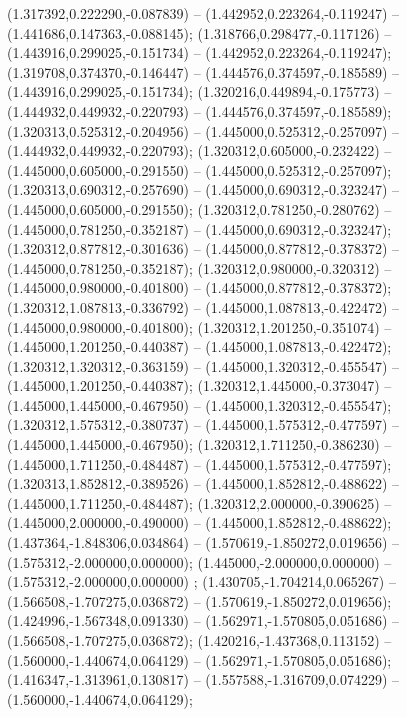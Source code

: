 (1.317392,0.222290,-0.087839) -- (1.442952,0.223264,-0.119247) -- (1.441686,0.147363,-0.088145);
 (1.318766,0.298477,-0.117126) -- (1.443916,0.299025,-0.151734) -- (1.442952,0.223264,-0.119247);
 (1.319708,0.374370,-0.146447) -- (1.444576,0.374597,-0.185589) -- (1.443916,0.299025,-0.151734);
 (1.320216,0.449894,-0.175773) -- (1.444932,0.449932,-0.220793) -- (1.444576,0.374597,-0.185589);
 (1.320313,0.525312,-0.204956) -- (1.445000,0.525312,-0.257097) -- (1.444932,0.449932,-0.220793);
 (1.320312,0.605000,-0.232422) -- (1.445000,0.605000,-0.291550) -- (1.445000,0.525312,-0.257097);
 (1.320313,0.690312,-0.257690) -- (1.445000,0.690312,-0.323247) -- (1.445000,0.605000,-0.291550);
 (1.320312,0.781250,-0.280762) -- (1.445000,0.781250,-0.352187) -- (1.445000,0.690312,-0.323247);
 (1.320312,0.877812,-0.301636) -- (1.445000,0.877812,-0.378372) -- (1.445000,0.781250,-0.352187);
 (1.320312,0.980000,-0.320312) -- (1.445000,0.980000,-0.401800) -- (1.445000,0.877812,-0.378372);
 (1.320312,1.087813,-0.336792) -- (1.445000,1.087813,-0.422472) -- (1.445000,0.980000,-0.401800);
 (1.320312,1.201250,-0.351074) -- (1.445000,1.201250,-0.440387) -- (1.445000,1.087813,-0.422472);
 (1.320312,1.320312,-0.363159) -- (1.445000,1.320312,-0.455547) -- (1.445000,1.201250,-0.440387);
 (1.320312,1.445000,-0.373047) -- (1.445000,1.445000,-0.467950) -- (1.445000,1.320312,-0.455547);
 (1.320312,1.575312,-0.380737) -- (1.445000,1.575312,-0.477597) -- (1.445000,1.445000,-0.467950);
 (1.320312,1.711250,-0.386230) -- (1.445000,1.711250,-0.484487) -- (1.445000,1.575312,-0.477597);
 (1.320313,1.852812,-0.389526) -- (1.445000,1.852812,-0.488622) -- (1.445000,1.711250,-0.484487);
 (1.320312,2.000000,-0.390625) -- (1.445000,2.000000,-0.490000) -- (1.445000,1.852812,-0.488622);
 (1.437364,-1.848306,0.034864) -- (1.570619,-1.850272,0.019656) -- (1.575312,-2.000000,0.000000);
 (1.445000,-2.000000,0.000000) -- (1.575312,-2.000000,0.000000) ;
 (1.430705,-1.704214,0.065267) -- (1.566508,-1.707275,0.036872) -- (1.570619,-1.850272,0.019656);
 (1.424996,-1.567348,0.091330) -- (1.562971,-1.570805,0.051686) -- (1.566508,-1.707275,0.036872);
 (1.420216,-1.437368,0.113152) -- (1.560000,-1.440674,0.064129) -- (1.562971,-1.570805,0.051686);
 (1.416347,-1.313961,0.130817) -- (1.557588,-1.316709,0.074229) -- (1.560000,-1.440674,0.064129);
